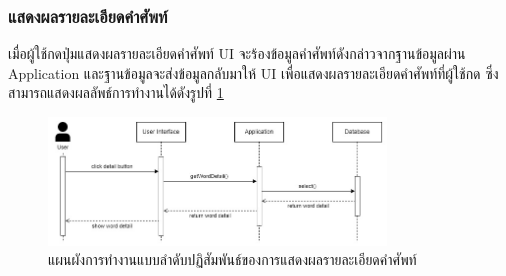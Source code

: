 \documentclass[12pt,oneside,openright,a4paper]{cpe-thai-project}
\begin{document}
\subsubsection{แสดงผลรายละเอียดคำศัพท์}
\hspace{1cm}
เมื่อผู้ใช้กดปุ่มแสดงผลรายละเอียดคำศัพท์ UI จะร้องข้อมูลคำศัพท์ดังกล่าวจากฐานข้อมูลผ่าน Application
และฐานข้อมูลจะส่งข้อมูลกลับมาให้ UI เพื่อแสดงผลรายละเอียดคำศัพท์ที่ผู้ใช้กด ซึ่งสามารถแสดงผลลัพธ์การทำงานได้ดังรูปที่ \ref{fig:S_WordDetail}
\begin{figure}[!h]\centering
	\includegraphics[width=0.8\textwidth, keepaspectratio=true]{image/chap3/sequence/View-Search.jpg}
	\caption{แผนผังการทำงานแบบลำดับปฏิสัมพันธ์ของการแสดงผลรายละเอียดคำศัพท์}\label{fig:S_WordDetail}
\end{figure}



\pagebreak
\end{document}
